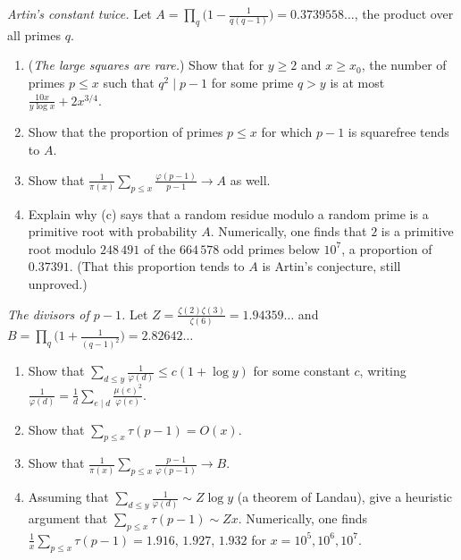 \begin{exercise}[$\star\star\star$]\label{pb:pminusone}
\emph{Artin's constant twice.} Let $A=\prod_q\bigl(1-\frac1{q(q-1)}\bigr)=0.3739558\ldots$, the product over all primes $q$.
\begin{enumerate}[label=(\alph*)]
\item (\emph{The large squares are rare.}) Show that for $y\ge2$ and $x\ge x_0$, the number of primes $p\le x$ such that $q^2\mid p-1$ for some prime $q>y$ is at most $\frac{10x}{y\log x}+2x^{3/4}$.
\item Show that the proportion of primes $p\le x$ for which $p-1$ is squarefree tends to $A$.
\item Show that $\frac1{\pi(x)}\sum_{p\le x}\frac{\varphi(p-1)}{p-1}\to A$ as well.
\item Explain why (c) says that a random residue modulo a random prime is a primitive root with probability $A$. Numerically, one finds that $2$ is a primitive root modulo
$248\,491$ of the $664\,578$ odd primes below $10^7$, a proportion of $0.37391$. (That this proportion tends to $A$ is Artin's conjecture, still unproved.)
\end{enumerate}
\end{exercise}

\begin{exercise}[$\star\star$]\label{pb:titchmarsh}
\emph{The divisors of $p-1$.} Let $Z=\frac{\zeta(2)\zeta(3)}{\zeta(6)}=1.94359\ldots$ and $B=\prod_q\bigl(1+\frac1{(q-1)^2}\bigr)=2.82642\ldots$
\begin{enumerate}[label=(\alph*)]
\item Show that $\sum_{d\le y}\frac1{\varphi(d)}\le c(1+\log y)$ for some constant $c$, writing $\frac1{\varphi(d)}=\frac1d\sum_{e\mid d}\frac{\mu(e)^2}{\varphi(e)}$.
\item Show that $\sum_{p\le x}\tau(p-1)=O(x)$.
\item Show that $\frac1{\pi(x)}\sum_{p\le x}\frac{p-1}{\varphi(p-1)}\to B$.
\item Assuming that $\sum_{d\le y}\frac1{\varphi(d)}\sim Z\log y$ (a theorem of Landau), give a heuristic argument that $\sum_{p\le x}\tau(p-1)\sim Zx$. Numerically, one finds
$\frac1x\sum_{p\le x}\tau(p-1)=1.916$, $1.927$, $1.932$ for $x=10^5,10^6,10^7$.
\end{enumerate}
\end{exercise}

